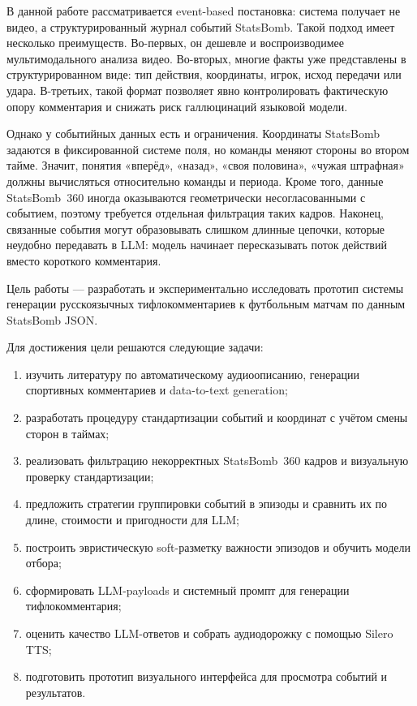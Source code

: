\documentclass[a4paper,14pt]{extarticle}
\numberwithin{table}{section}
\numberwithin{figure}{section}
\numberwithin{equation}{section}
\begin{document}
В данной работе рассматривается event-based постановка: система получает не видео, а структурированный журнал событий StatsBomb. Такой подход имеет несколько преимуществ. Во-первых, он дешевле и воспроизводимее мультимодального анализа видео. Во-вторых, многие факты уже представлены в структурированном виде: тип действия, координаты, игрок, исход передачи или удара. В-третьих, такой формат позволяет явно контролировать фактическую опору комментария и снижать риск галлюцинаций языковой модели.

Однако у событийных данных есть и ограничения. Координаты StatsBomb задаются в фиксированной системе поля, но команды меняют стороны во втором тайме. Значит, понятия «вперёд», «назад», «своя половина», «чужая штрафная» должны вычисляться относительно команды и периода. Кроме того, данные StatsBomb~360 иногда оказываются геометрически несогласованными с событием, поэтому требуется отдельная фильтрация таких кадров. Наконец, связанные события могут образовывать слишком длинные цепочки, которые неудобно передавать в LLM: модель начинает пересказывать поток действий вместо короткого комментария.

Цель работы --- разработать и экспериментально исследовать прототип системы генерации русскоязычных тифлокомментариев к футбольным матчам по данным StatsBomb JSON.

Для достижения цели решаются следующие задачи:

\begin{enumerate}
    \item изучить литературу по автоматическому аудиоописанию, генерации спортивных комментариев и data-to-text generation;
    \item разработать процедуру стандартизации событий и координат с учётом смены сторон в таймах;
    \item реализовать фильтрацию некорректных StatsBomb~360 кадров и визуальную проверку стандартизации;
    \item предложить стратегии группировки событий в эпизоды и сравнить их по длине, стоимости и пригодности для LLM;
    \item построить эвристическую soft-разметку важности эпизодов и обучить модели отбора;
    \item сформировать LLM-payloads и системный промпт для генерации тифлокомментария;
    \item оценить качество LLM-ответов и собрать аудиодорожку с помощью Silero TTS;
    \item подготовить прототип визуального интерфейса для просмотра событий и результатов.
\end{enumerate}
\end{document}
